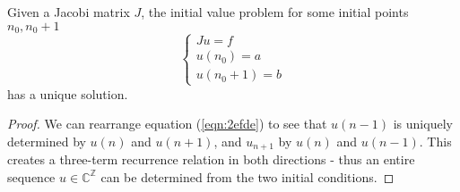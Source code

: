 \documentclass[../main.tex]{subfiles}
\begin{document}
\begin{proposition}\label{thm:2efde-sols}
Given a Jacobi matrix $J$, the initial value problem for some initial points $n_0, n_0 + 1$
$$
\begin{cases}
Ju = f\\
u(n_0) = a\\
u(n_0 + 1) = b
\end{cases}
$$
has a unique solution.
\end{proposition}
\begin{proof}
We can rearrange equation (\ref{eqn:2efde}) to see that $u(n-1)$ is uniquely determined by $u(n)$ and $u(n+1)$, and $u_{n+1}$ by $u(n)$ and $u(n-1)$. This creates a three-term recurrence relation in both directions - thus an entire sequence $u \in \mathbb{C}^\mathbb{Z}$ can be determined from the two initial conditions.
\end{proof}
\end{document}
